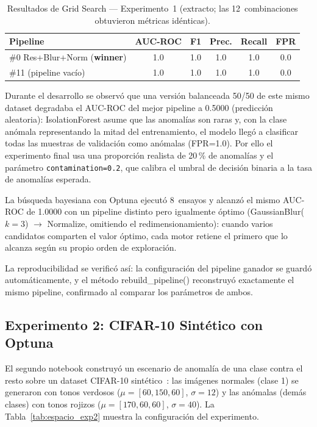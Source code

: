 \documentclass[conference,spanish]{IEEEtran}
\begin{document}
\begin{table}[t]
\centering
\renewcommand{\arraystretch}{1.2}
\caption{Resultados de Grid Search — Experimento~1 (extracto; las
  12~combinaciones obtuvieron métricas idénticas).}
\label{tab:metricas_exp1}
\begin{tabular}{@{}lccccc@{}}
\toprule
\textbf{Pipeline} & \textbf{AUC-ROC} & \textbf{F1} & \textbf{Prec.} &
\textbf{Recall} & \textbf{FPR} \\
\midrule
\#0 Res+Blur+Norm (\textbf{winner}) & 1.0 & 1.0 & 1.0 & 1.0 & 0.0 \\
\#11 (pipeline vacío)                            & 1.0 & 1.0 & 1.0 & 1.0 & 0.0 \\
\bottomrule
\end{tabular}
\end{table}

Durante el desarrollo se observó que una versión balanceada 50/50 de este
mismo dataset degradaba el AUC-ROC del mejor pipeline a 0.5000
(predicción aleatoria): IsolationForest asume que las anomalías son raras
y, con la clase anómala representando la mitad del entrenamiento, el
modelo llegó a clasificar todas las muestras de validación como anómalas
(FPR=1.0). Por ello el experimento final usa una proporción realista de
20\,\% de anomalías y el parámetro \texttt{contamination=0.2}, que calibra
el umbral de decisión binaria a la tasa de anomalías esperada.

La búsqueda bayesiana con Optuna ejecutó 8~ensayos y alcanzó el mismo
AUC-ROC de 1.0000 con un pipeline distinto pero igualmente óptimo
(GaussianBlur($k=3$) $\to$ Normalize, omitiendo el redimensionamiento):
cuando varios candidatos comparten el valor óptimo, cada motor retiene el
primero que lo alcanza según su propio orden de exploración.

La reproducibilidad se verificó así: la configuración del pipeline
ganador se guardó automáticamente, y el método rebuild\_pipeline() reconstruyó exactamente el mismo pipeline,
confirmado al comparar los parámetros de ambos.

\subsection{Experimento 2: CIFAR-10 Sintético con Optuna}

El segundo notebook construyó un
escenario de anomalía de una clase contra el resto sobre un dataset
CIFAR-10 sintético~\cite{krizhevsky2009cifar}: las imágenes normales
(clase 1) se generaron con tonos verdosos ($\mu=[60,150,60]$,
$\sigma=12$) y las anómalas (demás clases) con tonos rojizos
($\mu=[170,60,60]$, $\sigma=40$). La Tabla~\ref{tab:espacio_exp2} muestra
la configuración del experimento.
\end{document}

